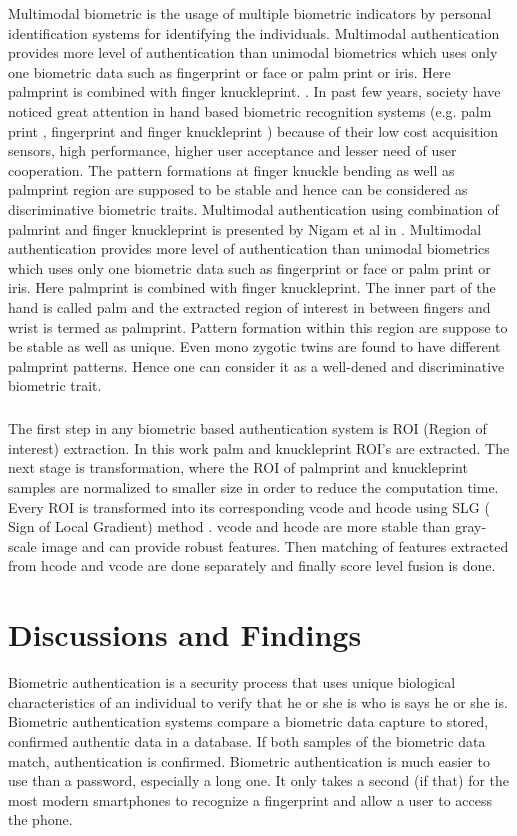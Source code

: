 \documentclass[10pt,a4paper,journal]{IEEEtran}
\begin{document}
\hspace{2em} Multimodal biometric is the usage of multiple biometric indicators by personal identification systems for identifying the individuals. Multimodal authentication provides more level of authentication than unimodal biometrics which uses only one biometric data such as fingerprint or face or palm print or iris. Here palmprint is combined with finger knuckleprint. . In past few years, society have noticed great attention in hand based biometric recognition systems (e.g. palm print \cite{11}, fingerprint and finger knuckleprint \cite{12} ) because of their low cost acquisition sensors, high performance, higher user acceptance and lesser need of user cooperation. The pattern formations at finger knuckle bending \cite{13} as well as palmprint region are supposed to be stable and hence can be considered as discriminative biometric traits. Multimodal authentication using combination of palmrint and finger knuckleprint is presented by Nigam et al in \cite{14}. Multimodal authentication provides more level of authentication than unimodal biometrics which uses only one biometric data such as fingerprint or face or palm print or iris. Here palmprint is combined with finger knuckleprint. 
The inner part of the hand is called palm and the extracted region of interest in
between fingers and wrist is termed as palmprint. Pattern formation within this region are suppose to be stable as well as unique. Even mono zygotic twins are found to have different palmprint patterns. Hence one can consider it as a well-dened and discriminative biometric trait.

\subparagraph{}The first step in any biometric based authentication system is ROI (Region of interest) extraction\cite{14}. In this work palm and knuckleprint ROI's are extracted. The next stage is transformation, where the ROI of palmprint and knuckleprint samples are normalized to smaller size in order to reduce the computation time. Every ROI is transformed into its corresponding vcode and hcode using SLG ( Sign of Local Gradient) method \cite{14}. vcode and hcode are more stable than gray-scale image and can provide robust features. Then matching of features extracted from hcode and vcode are done separately and finally score level fusion is done\cite{15}.


\section{Discussions and Findings}

\hspace{2em}  Biometric authentication is a security process that uses unique biological characteristics of an individual to verify that he or she is who is says he or she is. Biometric authentication systems compare a biometric data capture to stored, confirmed authentic data in a database. If both samples of the biometric data match, authentication is confirmed. Biometric authentication is much easier to use than a password, especially a long one. It only takes a second (if that) for the most modern smartphones to recognize a fingerprint and allow a user to access the phone. 
\end{document}
